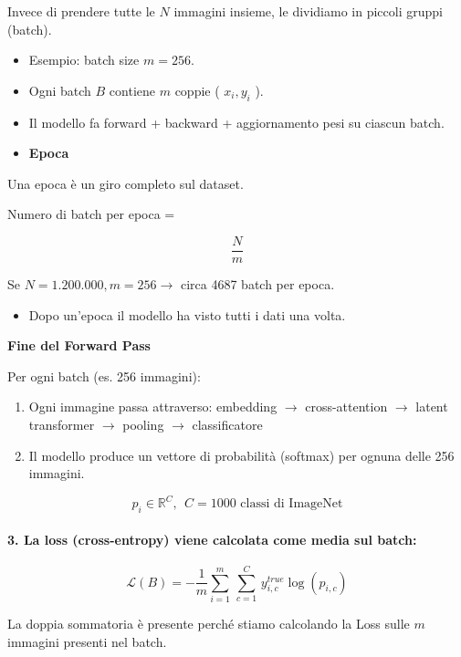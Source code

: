 \documentclass[
  11pt,
]{article}
\begin{document}
Invece di prendere tutte le \(N\) immagini insieme, le dividiamo in
piccoli gruppi (batch).


\begin{itemize}
\item
  Esempio: batch size \(m = 256\).
\item
  Ogni batch \(B\) contiene \(m\) coppie ( \(x_{i},y_{i}\) ).
\item
  Il modello fa forward + backward + aggiornamento pesi su ciascun
  batch.
\item
  \textbf{Epoca}
\end{itemize}


Una epoca è un giro completo sul dataset.


Numero di batch per epoca =


\[\frac{N}{m}\]

Se \(N = 1.200.000,m = 256 \rightarrow\) circa 4687 batch per epoca.


\begin{itemize}
\item
  Dopo un'epoca il modello ha visto tutti i dati una
  volta.
\end{itemize}

\textbf{Fine del Forward Pass}

Per ogni batch (es. 256 immagini):

\begin{enumerate}
\def\labelenumi{\arabic{enumi}.}
\item
  Ogni immagine passa attraverso: embedding \(\rightarrow\)
  cross-attention \(\rightarrow\) latent transformer \(\rightarrow\)
  pooling \(\rightarrow\) classificatore
\item
  Il modello produce un vettore di probabilità (softmax) per ognuna
  delle 256 immagini.
\end{enumerate}

\[p_{i} \in \mathbb{R}^{C},\ \ C = 1000\text{ classi di ImageNet}\]

\paragraph{3. La loss (cross-entropy) viene calcolata come media sul batch:}

\[\mathcal{L}(B) = - \frac{1}{m}\sum_{i = 1}^{m}\,\sum_{c = 1}^{C}\, y_{i,c}^{true}\log\left( p_{i,c} \right)\]

La doppia sommatoria è presente perché stiamo calcolando la Loss sulle
\(m\) immagini presenti nel batch.
\end{document}
